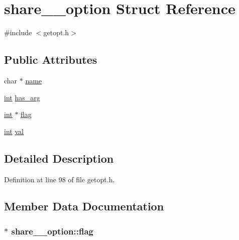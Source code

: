 \hypertarget{structshare____option}{}\section{share\+\_\+\+\_\+option Struct Reference}
\label{structshare____option}


{\ttfamily \#include $<$getopt.\+h$>$}

\subsection*{Public Attributes}
\begin{DoxyCompactItemize}
\item 
char $\ast$ \hyperlink{structshare____option_aa2ac1f332cd44329a9cec91813ba70bd}{name}
\item 
\hyperlink{xmltok_8h_a5a0d4a5641ce434f1d23533f2b2e6653}{int} \hyperlink{structshare____option_a8f5933942ecba67c80ed113c7ba12725}{has\+\_\+arg}
\item 
\hyperlink{xmltok_8h_a5a0d4a5641ce434f1d23533f2b2e6653}{int} $\ast$ \hyperlink{structshare____option_abd332dad563f98ab159f4cced7b3113e}{flag}
\item 
\hyperlink{xmltok_8h_a5a0d4a5641ce434f1d23533f2b2e6653}{int} \hyperlink{structshare____option_af06fa702ffc81a9bf193cea62277e25a}{val}
\end{DoxyCompactItemize}


\subsection{Detailed Description}


Definition at line 98 of file getopt.\+h.



\subsection{Member Data Documentation}
\subsubsection[{\texorpdfstring{flag}{flag}}]{$\ast$ share\+\_\+\+\_\+option\+::flag}\hypertarget{structshare____option_abd332dad563f98ab159f4cced7b3113e}{}\label{structshare____option_abd332dad563f98ab159f4cced7b3113e}


